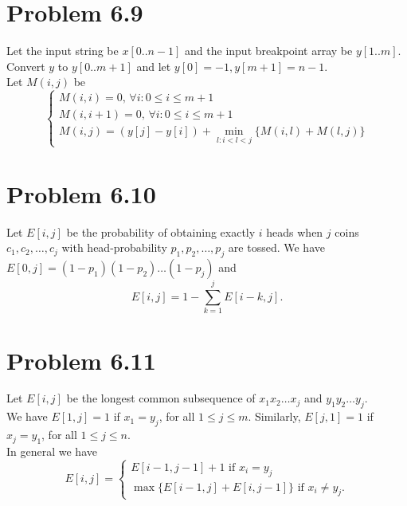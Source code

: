 \documentclass[12pt]{article}
\begin{document}
\section{Problem 6.9}
Let the input string be $x[0..n-1]$ and the input breakpoint array be $y[1..m]$. Convert $y$ to $y[0..m+1]$ and let $y[0] = -1, y[m+1] = n-1$. \\
Let $M(i,j)$ be 
$$\begin{cases} M(i,i)=0\text{, }\forall i: 0 \le i \le m + 1 \\
M(i,i + 1)=0\text{, }\forall i: 0 \le i \le m + 1\\
M(i,j)=\left(y[j]-y[i]\right) + \displaystyle \min_{l: i < l < j}\{M(i,l) + M(l,j)\}
\end{cases}$$

\section{Problem 6.10}
Let $E[i,j]$ be the probability of obtaining exactly $i$ heads when $j$ coins $c_1, c_2, \ldots, c_j$ with head-probability $p_1, p_2, \ldots, p_j$ are tossed.
We have $E[0,j] = (1-p_1)(1-p_2) \ldots (1-p_j)$ and $$E[i,j] = 1 - \sum_{k=1}^j E[i-k,j].$$

\section{Problem 6.11}
Let $E[i,j]$ be the longest common subsequence of $x_1 x_2 \ldots x_j$ and $y_1 y_2 \ldots y_j$. \\
We have $E[1,j] = 1$ if $x_1 = y_j$, for all $1 \le j \le m$. Similarly, $E[j,1] = 1$ if $x_j = y_1$, for all $1 \le j \le n$. \\
In general we have $$E[i,j] = \begin{cases} E[i-1,j-1] + 1 \text{ if } x_i = y_j \\ \max \{E[i-1,j] + E[i,j-1] \} \text{ if } x_i \ne y_j. \end{cases}$$
\end{document}
